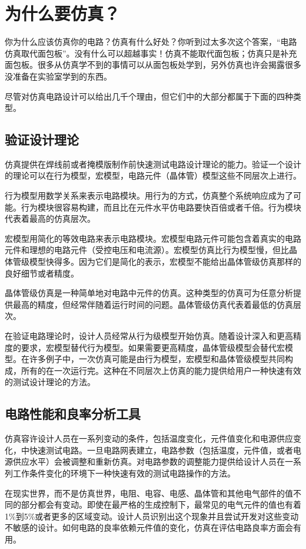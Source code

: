 \section{为什么要仿真？}
你为什么应该仿真你的电路？仿真有什么好处？你听到过太多次这个答案，“电路仿真取代面包板”。没有什么可以超越事实！仿真不能取代面包板；仿真只是补充面包板。很多从仿真学不到的事情可以从面包板处学到，另外仿真也许会揭露很多没准备在实验室学到的东西。

尽管对仿真电路设计可以给出几千个理由，但它们中的大部分都属于下面的四种类型。
\subsection{验证设计理论}
仿真提供在焊线前或者掩模版制作前快速测试电路设计理论的能力。验证一个设计的理论可以在行为模型，宏模型，电路元件（晶体管）模型这些不同层次上进行。

行为模型用数学关系来表示电路模块。用行为的方式，仿真整个系统响应成为了可能。行为模块很容易构建，而且比在元件水平仿电路要快百倍或者千倍。行为模块代表着最高的仿真层次。

宏模型用简化的等效电路来表示电路模块。宏模型电路元件可能包含着真实的电路元件和理想的电路元件（受控电压和电流源）。宏模型仿真比行为模型慢，但比晶体管级模型快得多。因为它们是简化的表示，宏模型不能给出晶体管级仿真那样的良好细节或者精度。

晶体管级仿真是一种简单地对电路中元件的仿真。这种类型的仿真可为任意分析提供最高的精度，但经常伴随着运行时间的问题。晶体管级仿真代表着最低的仿真层次。

在验证电路理论时，设计人员经常从行为级模型开始仿真。随着设计深入和更高精度的要求，宏模型替代行为模型。如果需要更高精度，晶体管级模型会替代宏模型。在许多例子中，一次仿真可能是由行为模型，宏模型和晶体管级模型共同构成，所有的在一次运行完。这种在不同层次上仿真的能力提供给用户一种快速有效的测试设计理论的方法。

\subsection{电路性能和良率分析工具}
仿真容许设计人员在一系列变动的条件，包括温度变化，元件值变化和电源供应变化，中快速测试电路。一旦电路网表建立，电路参数（包括温度，元件值，或者电源供应水平）会被调整和重新仿真。对电路参数的调整能力提供给设计人员在一系列工作条件变化的环境下一种快速有效的测试电路操作的方法。

在现实世界，而不是仿真世界，电阻、电容、电感、晶体管和其他电气部件的值不同的部分都会有变动。即使在最严格的生成控制下，最常见的电气元件的值也有着1\%到5\%或者更多的区域变动。设计人员识别出这个现象并且尝试开发对这些变动不敏感的设计。如何电路的良率依赖元件值的变化，仿真在评估电路良率方面会有用。

